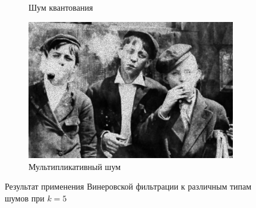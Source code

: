 \begin{figure}[ht]
\begin{subfigure}[b]{0.5\linewidth}
      \caption{Шум квантования} 
      \label{weiner_5:e}
    \end{subfigure}%
    \begin{subfigure}[b]{0.5\linewidth}
        \centering
        \includegraphics[width=0.95\linewidth]{../Wiener_Filter/Wiener_Speckle_noise_(k=5).jpg} 
        \caption{Мультипликативный шум} 
        \label{weiner_5:f} 
    \end{subfigure} 
    \caption{Результат применения Винеровской фильтрации к различным типам шумов при $k = 5$}
    \label{img:weiner_5} 
\end{figure}

